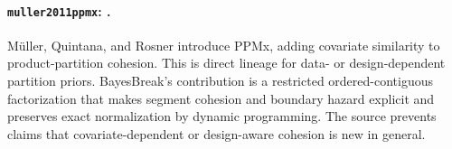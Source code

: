 
\paragraph{\texttt{muller2011ppmx}: \citet{muller2011ppmx}.}
M\"uller, Quintana, and Rosner introduce PPMx, adding covariate similarity to product-partition cohesion. This is direct lineage for data- or design-dependent partition priors. BayesBreak's contribution is a restricted ordered-contiguous factorization that makes segment cohesion and boundary hazard explicit and preserves exact normalization by dynamic programming. The source prevents claims that covariate-dependent or design-aware cohesion is new in general.

